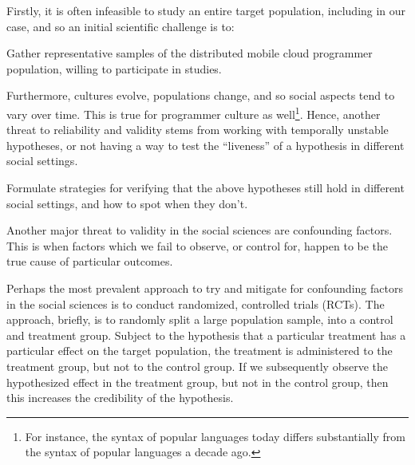 
 
Firstly, it is often infeasible to study an entire target population,
including in our case, and so an initial scientific challenge is to:

\begin{scientific-challenge}\label{challenge:representative-sample}

Gather representative samples of the distributed mobile cloud
programmer population, willing to participate in studies.

\end{scientific-challenge}

Furthermore, cultures evolve, populations change, and so social
aspects tend to vary over
time\cite{2008-Seven-Rules-for-Social-Research}. This is true for
programmer culture as well\footnote{For instance, the syntax of
popular languages today differs substantially from the syntax of
popular languages a decade ago.}. Hence, another threat to reliability
and validity stems from working with temporally unstable hypotheses,
or not having a way to test the ``liveness'' of a hypothesis in
different social settings.

\begin{scientific-challenge}\label{challenge:change}

Formulate strategies for verifying that the above hypotheses still
hold in different social settings, and how to spot when they don't.

\end{scientific-challenge}

Another major threat to validity in the social sciences are
confounding factors. This is when factors which we fail to observe, or
control for, happen to be the true cause of particular outcomes.

Perhaps the most prevalent approach to try and mitigate for
confounding factors in the social sciences is to conduct randomized,
controlled trials (RCTs)\cite{2016-Assessing-the-gold-standard,
2018-Understanding-and-misunderstanding-RCTs}. The approach, briefly,
is to randomly split a large population sample, into a control and
treatment group.  Subject to the hypothesis that a particular
treatment has a particular effect on the target population, the
treatment is administered to the treatment group, but not to the
control group. If we subsequently observe the hypothesized effect in
the treatment group, but not in the control group, then this increases
the credibility of the hypothesis.

